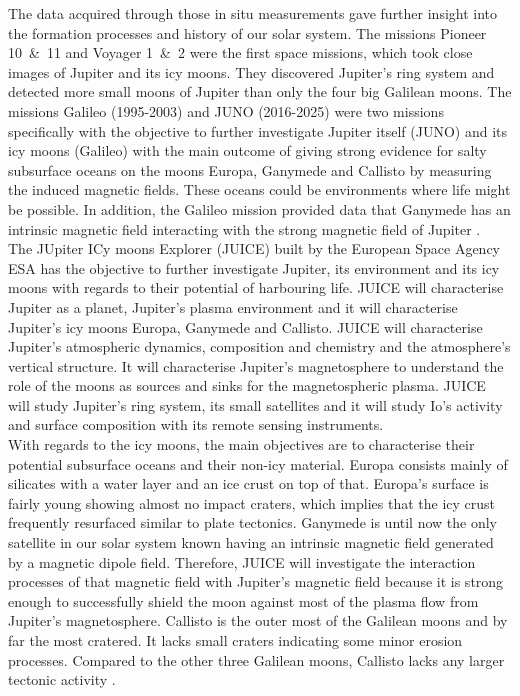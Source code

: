 	The data acquired through those in situ measurements gave further insight into the formation processes and history of our solar system. The missions Pioneer 10~\&~11 and Voyager 1~\&~2 were the first space missions, which took close images of Jupiter and its icy moons. They discovered Jupiter's ring system and detected more small moons of Jupiter than only the four big Galilean moons. The missions Galileo (1995-2003) and JUNO (2016-2025) were two missions specifically with the objective to further investigate Jupiter itself (JUNO) and its icy moons (Galileo) with the main outcome of giving strong evidence for salty subsurface oceans on the moons Europa, Ganymede and Callisto by measuring the induced magnetic fields. These oceans could be environments where life might be possible. In addition, the Galileo mission provided data that Ganymede has an intrinsic magnetic field interacting with the strong magnetic field of Jupiter \cite{Jupiter_SpaceMission}.\\
	The JUpiter ICy moons Explorer (JUICE) built by the European Space Agency ESA has the objective to further investigate Jupiter, its environment and its icy moons with regards to their potential of harbouring life. JUICE will characterise Jupiter as a planet, Jupiter's plasma environment and it will characterise Jupiter's icy moons Europa, Ganymede and Callisto. JUICE will characterise Jupiter's atmospheric dynamics, composition and chemistry and the atmosphere's vertical structure. It will characterise Jupiter's magnetosphere to understand the role of the moons as sources and sinks for the magnetospheric plasma. JUICE will study Jupiter's ring system, its small satellites and it will study Io's activity and surface composition with its remote sensing instruments.\\
	With regards to the icy moons, the main objectives are to characterise their potential subsurface oceans and their non-icy material. Europa consists mainly of silicates with a water layer and an ice crust on top of that. Europa's surface is fairly young showing almost no impact craters, which implies that the icy crust frequently resurfaced similar to plate tectonics. Ganymede is until now the only satellite in our solar system known having an intrinsic magnetic field generated by a magnetic dipole field. Therefore, JUICE will investigate the interaction processes of that magnetic field with Jupiter's magnetic field because it is strong enough to successfully shield the moon against most of the plasma flow from Jupiter's magnetosphere. Callisto is the outer most of the Galilean moons and by far the most cratered. It lacks small craters indicating some minor erosion processes. Compared to the other three Galilean moons, Callisto lacks any larger tectonic activity \cite{red_book}.\\
